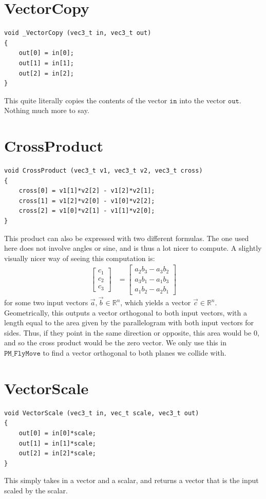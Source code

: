 \documentclass{article}
\begin{document}
\section{VectorCopy}
\begin{verbatim}
void _VectorCopy (vec3_t in, vec3_t out)
{
	out[0] = in[0];
	out[1] = in[1];
	out[2] = in[2];
}
\end{verbatim}
This quite literally copies the contents of the vector $\texttt{in}$ into the vector $\texttt{out}$. Nothing much more to say.
\section{CrossProduct}
\begin{verbatim}
void CrossProduct (vec3_t v1, vec3_t v2, vec3_t cross)
{
	cross[0] = v1[1]*v2[2] - v1[2]*v2[1];
	cross[1] = v1[2]*v2[0] - v1[0]*v2[2];
	cross[2] = v1[0]*v2[1] - v1[1]*v2[0];
}
\end{verbatim}
This product can also be expressed with two different formulas. The one used here does not involve angles or sine, and is thus a lot nicer to compute. A slightly visually nicer way of seeing this computation is:
\begin{align*}
\begin{bmatrix}
c_1 \\
c_2 \\
c_3
\end{bmatrix}
 &= 
 \begin{bmatrix}
     a_2 b_3 - a_3 b_2 \\
     a_3 b_1 - a_1 b_3 \\
     a_1 b_2 - a_2 b_1
 \end{bmatrix}
\end{align*}
for some two input vectors $\vec{a},\vec{b}\in\mathbb{R}^n$, which yields a vector $\vec{c}\in\mathbb{R}^n$. Geometrically, this outputs a vector orthogonal to both input vectors, with a length equal to the area given by the parallelogram with both input vectors for sides. Thus, if they  point in the same direction or opposite, this area would be 0, and so the cross product  would be the zero vector. We only use this in $\texttt{PM\_FlyMove}$ to find a vector orthogonal to both planes we collide with.
\section{VectorScale}
\begin{verbatim}
void VectorScale (vec3_t in, vec_t scale, vec3_t out)
{
	out[0] = in[0]*scale;
	out[1] = in[1]*scale;
	out[2] = in[2]*scale;
}
\end{verbatim}
This simply takes in a vector and a scalar, and returns a vector that is the input scaled by the scalar.
\end{document}
